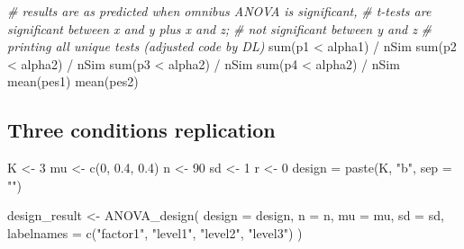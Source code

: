 \documentclass[
]{book}
\newenvironment{Shaded}{\begin{snugshade}}{\end{snugshade}}
\newcommand{\AttributeTok}[1]{\textcolor[rgb]{0.77,0.63,0.00}{#1}}
\newcommand{\CommentTok}[1]{\textcolor[rgb]{0.56,0.35,0.01}{\textit{#1}}}
\newcommand{\DecValTok}[1]{\textcolor[rgb]{0.00,0.00,0.81}{#1}}
\newcommand{\FloatTok}[1]{\textcolor[rgb]{0.00,0.00,0.81}{#1}}
\newcommand{\FunctionTok}[1]{\textcolor[rgb]{0.00,0.00,0.00}{#1}}
\newcommand{\NormalTok}[1]{#1}
\newcommand{\OtherTok}[1]{\textcolor[rgb]{0.56,0.35,0.01}{#1}}
\newcommand{\SpecialCharTok}[1]{\textcolor[rgb]{0.00,0.00,0.00}{#1}}
\newcommand{\StringTok}[1]{\textcolor[rgb]{0.31,0.60,0.02}{#1}}
\begin{document}
\begin{Shaded}
\begin{Highlighting}[]
\CommentTok{\# results are as predicted when omnibus ANOVA is significant,}
\CommentTok{\# t{-}tests are significant between x and y plus x and z; }
\CommentTok{\# not significant between y and z}
\CommentTok{\# printing all unique tests (adjusted code by DL)}
\FunctionTok{sum}\NormalTok{(p1 }\SpecialCharTok{\textless{}}\NormalTok{ alpha1) }\SpecialCharTok{/}\NormalTok{ nSim}
\FunctionTok{sum}\NormalTok{(p2 }\SpecialCharTok{\textless{}}\NormalTok{ alpha2) }\SpecialCharTok{/}\NormalTok{ nSim}
\FunctionTok{sum}\NormalTok{(p3 }\SpecialCharTok{\textless{}}\NormalTok{ alpha2) }\SpecialCharTok{/}\NormalTok{ nSim}
\FunctionTok{sum}\NormalTok{(p4 }\SpecialCharTok{\textless{}}\NormalTok{ alpha2) }\SpecialCharTok{/}\NormalTok{ nSim}
\FunctionTok{mean}\NormalTok{(pes1)}
\FunctionTok{mean}\NormalTok{(pes2)}
\end{Highlighting}
\end{Shaded}

\hypertarget{three-conditions-replication}{%
\subsection{Three conditions replication}\label{three-conditions-replication}}

\begin{Shaded}
\begin{Highlighting}[]
\NormalTok{K }\OtherTok{\textless{}{-}} \DecValTok{3}
\NormalTok{mu }\OtherTok{\textless{}{-}} \FunctionTok{c}\NormalTok{(}\DecValTok{0}\NormalTok{, }\FloatTok{0.4}\NormalTok{, }\FloatTok{0.4}\NormalTok{)}
\NormalTok{n }\OtherTok{\textless{}{-}} \DecValTok{90}
\NormalTok{sd }\OtherTok{\textless{}{-}} \DecValTok{1}
\NormalTok{r }\OtherTok{\textless{}{-}} \DecValTok{0}
\NormalTok{design }\OtherTok{=} \FunctionTok{paste}\NormalTok{(K, }\StringTok{"b"}\NormalTok{, }\AttributeTok{sep =} \StringTok{""}\NormalTok{)}
\end{Highlighting}
\end{Shaded}

\begin{Shaded}
\begin{Highlighting}[]
\NormalTok{design\_result }\OtherTok{\textless{}{-}} \FunctionTok{ANOVA\_design}\NormalTok{(}
  \AttributeTok{design =}\NormalTok{ design,}
  \AttributeTok{n =}\NormalTok{ n,}
  \AttributeTok{mu =}\NormalTok{ mu,}
  \AttributeTok{sd =}\NormalTok{ sd,}
  \AttributeTok{labelnames =} \FunctionTok{c}\NormalTok{(}\StringTok{"factor1"}\NormalTok{, }\StringTok{"level1"}\NormalTok{, }\StringTok{"level2"}\NormalTok{, }\StringTok{"level3"}\NormalTok{)}
\NormalTok{  )}
\end{Highlighting}
\end{Shaded}
\end{document}
